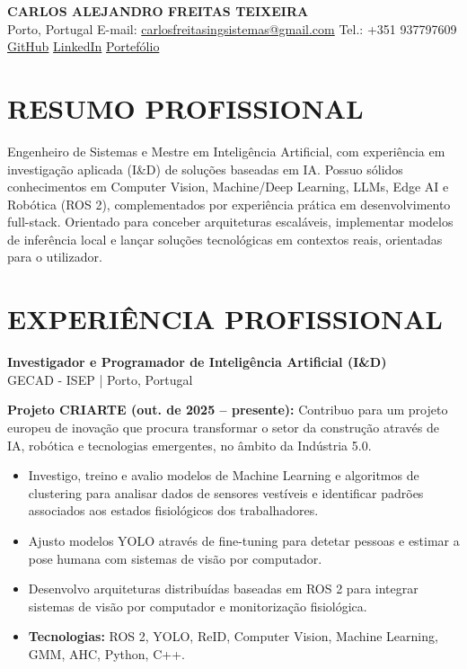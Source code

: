 \documentclass[10pt,a4paper]{article}
\begin{document}
\begin{center}
    {\LARGE\textbf{CARLOS ALEJANDRO FREITAS TEIXEIRA}}\\
    Porto, Portugal \textbar{} E-mail: \href{mailto:carlosfreitasingsistemas@gmail.com}{carlosfreitasingsistemas@gmail.com}
    \textbar{} Tel.: +351 937797609\\
    \href{https://github.com/CarlosFreitasING}{GitHub}
    \textbar{} \href{https://www.linkedin.com/in/carlos-alejandro-freitas-teixeira-82921a249/}{LinkedIn}
    \textbar{} \href{https://carlosfreitas32.wixsite.com/portafolio}{Portefólio}
\end{center}

\section*{RESUMO PROFISSIONAL}
Engenheiro de Sistemas e Mestre em Inteligência Artificial, com experiência em investigação aplicada (I\&D) de soluções baseadas em IA. Possuo sólidos conhecimentos em Computer Vision, Machine/Deep Learning, LLMs, Edge AI e Robótica (ROS 2), complementados por experiência prática em desenvolvimento full-stack. Orientado para conceber arquiteturas escaláveis, implementar modelos de inferência local e lançar soluções tecnológicas em contextos reais, orientadas para o utilizador.

\section*{EXPERIÊNCIA PROFISSIONAL}

\textbf{\large Investigador e Programador de Inteligência Artificial (I\&D)}\\
GECAD - ISEP | Porto, Portugal

\vspace{5pt}
\textbf{Projeto CRIARTE (out. de 2025 -- presente):} Contribuo para um projeto europeu de inovação que procura transformar o setor da construção através de IA, robótica e tecnologias emergentes, no âmbito da Indústria 5.0.
\begin{itemize}
    \item Investigo, treino e avalio modelos de Machine Learning e algoritmos de clustering para analisar dados de sensores vestíveis e identificar padrões associados aos estados fisiológicos dos trabalhadores.
    \item Ajusto modelos YOLO através de fine-tuning para detetar pessoas e estimar a pose humana com sistemas de visão por computador.
    \item Desenvolvo arquiteturas distribuídas baseadas em ROS 2 para integrar sistemas de visão por computador e monitorização fisiológica.
    \item \textbf{Tecnologias:} ROS 2, YOLO, ReID, Computer Vision, Machine Learning, GMM, AHC, Python, C++.
\end{itemize}
\end{document}
